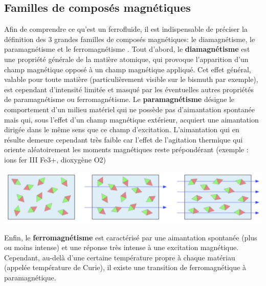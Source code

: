 \documentclass[10pt,a4paper]{article}
\begin{document}
\subsection{Familles de composés magnétiques}
Afin de comprendre ce qu’est un ferrofluide, il est indispensable de préciser la définition des 3 grandes
familles de composés magnétiques: le diamagnétisme, le paramagnétisme et le ferromagnétisme \cite{olympiades}.
\newline
\newline
Tout d’abord, le \textbf{diamagnétisme} est une propriété générale de la matière atomique, qui provoque
l'apparition d'un champ magnétique opposé à un champ magnétique appliqué. Cet effet général, valable
pour toute matière (particulièrement visible sur le bismuth par exemple), est cependant d’intensité limitée et masqué par les éventuelles autres propriétés de paramagnétisme ou ferromagnétisme.
\newline
\newline
Le \textbf{paramagnétisme} désigne le comportement d'un milieu matériel qui ne possède pas d'aimantation
spontanée mais qui, sous l'effet d'un champ magnétique extérieur, acquiert une aimantation dirigée dans
le même sens que ce champ d'excitation. L’aimantation qui en résulte demeure cependant très faible car
l’effet de l’agitation thermique qui oriente aléatoirement les moments magnétiques reste prépondérant (exemple : ions fer III Fe3+, dioxygène O2)
\begin{center}
\includegraphics[scale=0.6]{images/diag_para_ferro_mag.jpg} 
\end{center}
Enfin, le \textbf{ferromagnétisme} est caractérisé par une aimantation spontanée (plus ou moins intense) et une réponse très intense à une excitation magnétique. Cependant, au-delà d’une certaine température propre à chaque matériau (appelée température de Curie), il existe une transition de ferromagnétique à paramagnétique.
\end{document}
